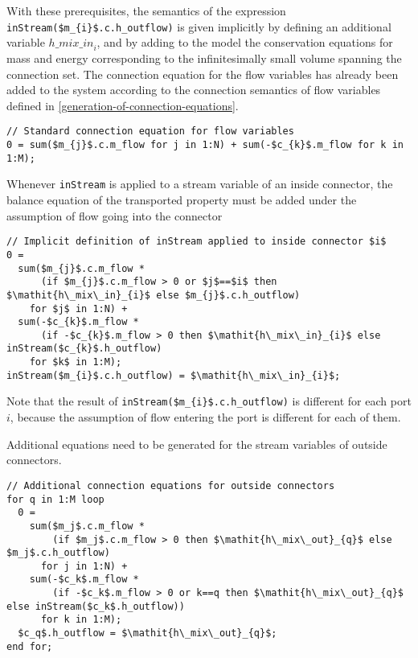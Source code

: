 With these prerequisites, the semantics of the expression
\lstinline[mathescape=true]!inStream($m_{i}$.c.h_outflow)! is given implicitly by
defining an additional variable $\mathit{h\_mix\_in}_{i}$, and by
adding to the model the conservation equations for mass and energy
corresponding to the infinitesimally small volume spanning the
connection set. The connection equation for the flow variables has
already been added to the system according to the connection semantics
of flow variables defined in \autoref{generation-of-connection-equations}.

\begin{lstlisting}[language=modelica,mathescape=true]
// Standard connection equation for flow variables
0 = sum($m_{j}$.c.m_flow for j in 1:N) + sum(-$c_{k}$.m_flow for k in 1:M);
\end{lstlisting}

Whenever \lstinline!inStream! is applied to a stream variable of an inside connector, the balance equation of the transported
property must be added under the assumption of flow going into the connector

\begin{lstlisting}[language=modelica,mathescape=true]
// Implicit definition of inStream applied to inside connector $i$
0 =
  sum($m_{j}$.c.m_flow *
      (if $m_{j}$.c.m_flow > 0 or $j$==$i$ then $\mathit{h\_mix\_in}_{i}$ else $m_{j}$.c.h_outflow)
    for $j$ in 1:N) +
  sum(-$c_{k}$.m_flow *
      (if -$c_{k}$.m_flow > 0 then $\mathit{h\_mix\_in}_{i}$ else inStream($c_{k}$.h_outflow)
    for $k$ in 1:M);
inStream($m_{i}$.c.h_outflow) = $\mathit{h\_mix\_in}_{i}$;
\end{lstlisting}

Note that the result of
\lstinline[mathescape=true]!inStream($m_{i}$.c.h_outflow)! is different
for each port $i$, because the assumption of flow entering the port is
different for each of them.

Additional equations need to be generated for the stream variables of
outside connectors.

\begin{lstlisting}[language=modelica,mathescape=true]
// Additional connection equations for outside connectors
for q in 1:M loop
  0 =
    sum($m_j$.c.m_flow *
        (if $m_j$.c.m_flow > 0 then $\mathit{h\_mix\_out}_{q}$ else $m_j$.c.h_outflow)
      for j in 1:N) +
    sum(-$c_k$.m_flow *
        (if -$c_k$.m_flow > 0 or k==q then $\mathit{h\_mix\_out}_{q}$ else inStream($c_k$.h_outflow))
      for k in 1:M);
  $c_q$.h_outflow = $\mathit{h\_mix\_out}_{q}$;
end for;
\end{lstlisting}

